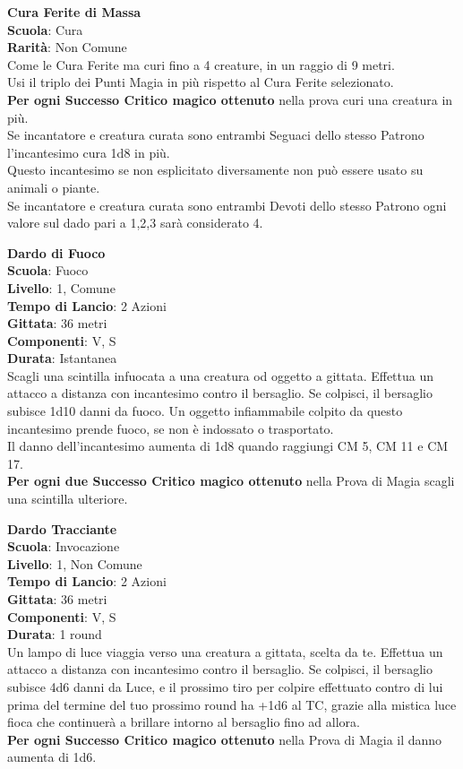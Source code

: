 \begin{multicols}{2}
\medskip\textbf{Cura Ferite di Massa}\\
\textbf{Scuola}: Cura\\
\textbf{Rarità}: Non Comune\\
Come le Cura Ferite ma curi fino a 4 creature, in un raggio di 9 metri.\\
Usi il triplo dei Punti Magia in più rispetto al Cura Ferite selezionato.\\
\textbf{Per ogni Successo Critico magico ottenuto} nella prova curi una creatura in più.\\
Se incantatore e creatura curata sono entrambi Seguaci dello stesso Patrono l'incantesimo cura 1d8 in più.\\
Questo incantesimo se non esplicitato diversamente non può essere usato su animali o piante.\\
Se incantatore e creatura curata sono entrambi Devoti dello stesso Patrono ogni valore sul dado pari a 1,2,3 sarà considerato 4.

\medskip\textbf{Dardo di Fuoco}\\
\textbf{Scuola}: Fuoco\\
\textbf{Livello}: 1, Comune\\
\textbf{Tempo di Lancio}: 2 Azioni\\
\textbf{Gittata}: 36 metri\\
\textbf{Componenti}: V, S\\
\textbf{Durata}: Istantanea\\
Scagli una scintilla infuocata a una creatura od oggetto a gittata. Effettua un attacco a distanza con incantesimo contro il bersaglio. Se colpisci, il bersaglio subisce 1d10 danni da fuoco. Un oggetto infiammabile colpito da questo incantesimo prende fuoco, se non è indossato o trasportato.\\
Il danno dell'incantesimo aumenta di 1d8 quando raggiungi CM 5, CM 11 e CM 17.\\
\textbf{Per ogni due Successo Critico magico ottenuto} nella Prova di Magia scagli una scintilla ulteriore.

\medskip\textbf{Dardo Tracciante}\\
\textbf{Scuola}: Invocazione\\
\textbf{Livello}: 1, Non Comune\\
\textbf{Tempo di Lancio}: 2 Azioni\\
\textbf{Gittata}: 36 metri\\
\textbf{Componenti}: V, S\\
\textbf{Durata}: 1 round\\
Un lampo di luce viaggia verso una creatura a gittata, scelta da te. Effettua un attacco a distanza con incantesimo contro il bersaglio. Se colpisci, il bersaglio subisce 4d6 danni da Luce, e il prossimo tiro per colpire effettuato contro di lui prima del termine del tuo
prossimo round ha +1d6 al TC, grazie alla mistica luce fioca che continuerà a brillare intorno al bersaglio fino ad allora.\\
\textbf{Per ogni Successo Critico magico ottenuto} nella Prova di Magia il danno aumenta di 1d6.


\end{multicols}
